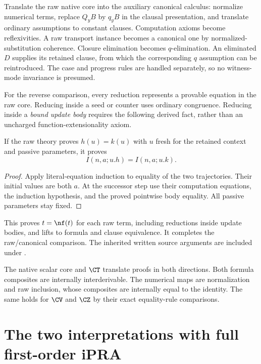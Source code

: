 Translate the raw native core into the auxiliary canonical calculus:
normalize numerical terms, replace $Q_yB$ by $q_yB$ in the clausal
presentation, and translate ordinary assumptions to constant clauses.
Computation axioms become reflexivities. A raw transport instance
becomes a canonical one by normalized-substitution coherence.
Closure elimination becomes $q$-elimination.
An eliminated $D$ supplies its retained clause, from which the corresponding
$q$ assumption can be reintroduced. The case and progress rules are handled
separately, so no witness-mode invariance is presumed.

For the reverse comparison, every reduction represents a provable
equation in the raw core. Reducing inside a seed or counter uses ordinary
congruence. Reducing inside a \emph{bound update body} requires the following
derived fact, rather than an uncharged function-extensionality axiom.

\begin{lemma}
If the raw theory proves $h(u)=k(u)$ with $u$ fresh for the retained
context and passive parameters, it proves
\[
 I(n,a;u.h)=I(n,a;u.k).
\]
\end{lemma}
\begin{proof}
Apply literal-equation induction to equality of the two trajectories.
Their initial values are both $a$. At the successor step use their
computation equations, the induction hypothesis, and the proved pointwise
body equality. All passive parameters stay fixed.
\end{proof}

This proves $t=\nf(t)$ for each raw term, including reductions inside
update bodies, and lifts to formula and clause equivalence. It completes the
raw/canonical comparison. The inherited written source arguments are
included under .

\begin{theorem}
The native scalar core and $\CT$ translate proofs in both directions.
Both formula composites are internally interderivable. The numerical
maps are normalization and raw inclusion, whose composites are
internally equal to the identity. The same holds for
$\CV$ and $\CZ$ by their exact equality-rule comparisons.
\end{theorem}

\section{The two interpretations with full first-order iPRA}
\label{sec:interpretations}


